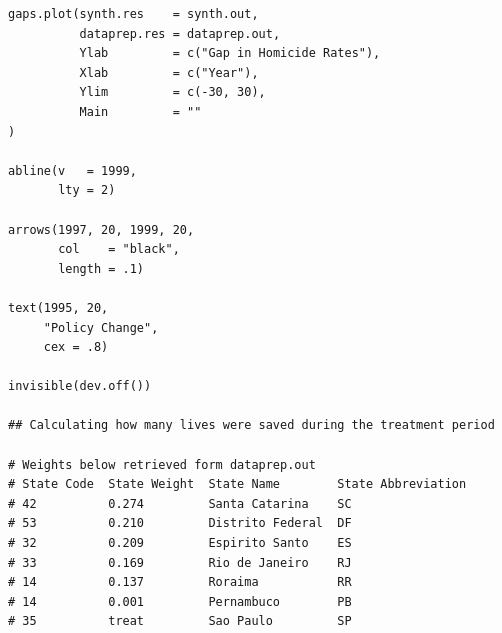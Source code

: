 \begin{verbatim}
gaps.plot(synth.res    = synth.out,
          dataprep.res = dataprep.out,
          Ylab         = c("Gap in Homicide Rates"),
          Xlab         = c("Year"),
          Ylim         = c(-30, 30),
          Main         = ""
)

abline(v   = 1999,
       lty = 2)

arrows(1997, 20, 1999, 20,
       col    = "black",
       length = .1)

text(1995, 20,
     "Policy Change",
     cex = .8)

invisible(dev.off())

## Calculating how many lives were saved during the treatment period

# Weights below retrieved form dataprep.out
# State Code  State Weight  State Name        State Abbreviation
# 42          0.274         Santa Catarina    SC
# 53          0.210         Distrito Federal  DF
# 32          0.209         Espirito Santo    ES
# 33          0.169         Rio de Janeiro    RJ
# 14          0.137         Roraima           RR
# 14          0.001         Pernambuco        PB
# 35          treat         Sao Paulo         SP
\end{verbatim}

